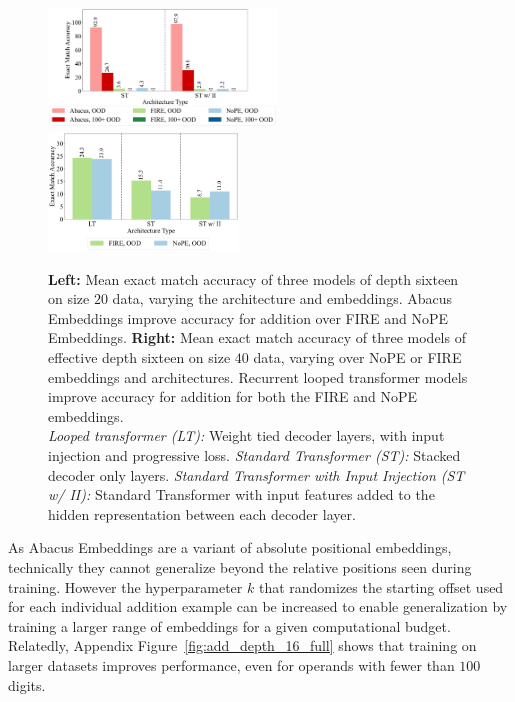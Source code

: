 \documentclass{article}
\begin{document}
\begin{figure}[t] %
    \centering
    \includegraphics[width=0.54\textwidth]{Figures/plot_one_no_dt_2_bars.pdf}
    \includegraphics[width=0.45\textwidth]{Figures/plot_three_no_recycle_2_bars.pdf}
    \caption{ 
    \textbf{Left: } Mean exact match accuracy of three models of depth sixteen on size $20$ data, varying the architecture and embeddings. 
    Abacus Embeddings improve accuracy for addition over FIRE and NoPE Embeddings.
    \textbf{Right: } Mean exact match accuracy of three models of effective depth sixteen on size $40$ data, varying over NoPE or FIRE embeddings and architectures.  
    Recurrent looped transformer models improve accuracy for addition for both the FIRE and NoPE embeddings.\\
    \textit{Looped transformer (LT):} Weight tied decoder layers, with input injection and progressive loss. \textit{Standard Transformer (ST):} Stacked decoder only layers. \textit{Standard Transformer with Input Injection (ST w/ II):} Standard Transformer with input features added to the hidden representation between each decoder layer.
    }
    \label{fig:add_depth_16}
\end{figure}

As Abacus Embeddings are a variant of absolute positional embeddings, technically they cannot generalize beyond the relative positions seen during training. However the hyperparameter \(k\) that randomizes the starting offset used for each individual addition example can be increased to enable generalization by training a larger range of embeddings for a given computational budget.
Relatedly, Appendix Figure~\ref{fig:add_depth_16_full} shows that training on larger datasets improves performance, even for operands with fewer than $100$ digits.
\end{document}

